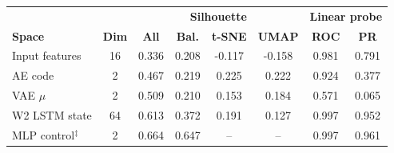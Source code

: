 \begin{tabular}{lccccccc}
\hline
& & \multicolumn{4}{c}{\textbf{Silhouette}} & \multicolumn{2}{c}{\textbf{Linear probe}} \\
\textbf{Space} & \textbf{Dim} & \textbf{All} & \textbf{Bal.} & \textbf{t-SNE} & \textbf{UMAP} & \textbf{ROC} & \textbf{PR} \\ \hline
Input features & 16 & 0.336 & 0.208 & -0.117 & -0.158 & 0.981 & 0.791 \\
AE code & 2 & 0.467 & 0.219 & 0.225 & 0.222 & 0.924 & 0.377 \\
VAE $\mu$ & 2 & 0.509 & 0.210 & 0.153 & 0.184 & 0.571 & 0.065 \\
W2 LSTM state & 64 & 0.613 & 0.372 & 0.191 & 0.127 & 0.997 & 0.952 \\
MLP control$^\ddagger$ & 2 & 0.664 & 0.647 & -- & -- & 0.997 & 0.961 \\
\hline
\end{tabular}

